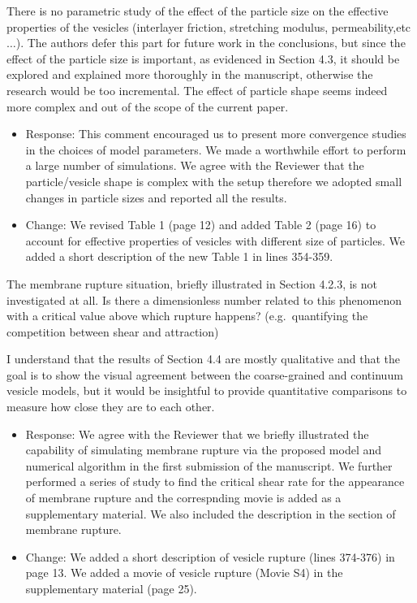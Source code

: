 \documentclass[11pt]{article}
\newcommand{\comment}[1]{{\color{blue} #1}}
\begin{document}
\noindent
\comment{There is no parametric study of the effect of the particle size
on the effective properties of the vesicles (interlayer friction,
stretching modulus, permeability,etc$\ldots$). The authors defer this
part for future work in the conclusions, but since the effect of the
particle size is important, as evidenced in Section 4.3, it should be
explored and explained more thoroughly in the manuscript, otherwise the
research would be too incremental. The effect of particle shape seems
indeed more complex and out of the scope of the current paper.}
\begin{itemize}
  \item Response: This comment encouraged us to present more convergence studies in the choices of model parameters. We made a worthwhile effort to perform a large number of simulations. We agree with the Reviewer that the particle/vesicle shape is complex with the setup therefore we adopted small changes in particle sizes and reported all the results.
  \item Change: We revised Table 1 (page 12) and added Table 2 (page 16) to account for effective properties of vesicles with different size of particles. We added a short description of the new Table 1 in lines 354-359. 
\end{itemize}

\noindent
\comment{The membrane rupture situation, briefly illustrated in Section
4.2.3, is not investigated at all. Is there a dimensionless number
related to this phenomenon with a critical value above which rupture
happens? (e.g.~quantifying the competition between shear and
attraction)}

\noindent
\comment{I understand that the results of Section 4.4 are mostly
qualitative and that the goal is to show the visual agreement between
the coarse-grained and continuum vesicle models, but it would be
insightful to provide quantitative comparisons to measure how close they
are to each other.}
\begin{itemize}
  \item Response: We agree with the Reviewer that we briefly illustrated the capability of simulating membrane rupture via the proposed model and numerical algorithm in the first submission of the manuscript. We further performed a series of study to find the critical shear rate for the appearance of membrane rupture and the correspnding movie is added as a supplementary material. We also included the description in the section of membrane rupture.
  \item Change: We added a short description of vesicle rupture (lines 374-376) in page 13. We added a movie of vesicle rupture (Movie S4) in the supplementary material (page 25).
  
\end{itemize}
\end{document}
